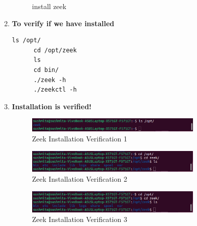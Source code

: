 \begin{enumerate}
\begin{figure}[H]
  \caption{install zeek}
\end{figure}
  \item \textbf{To verify if we have installed}
    \begin{lstlisting}[style=bashstyle]
      ls /opt/
      cd /opt/zeek
      ls
      cd bin/
      ./zeek -h
      ./zeekctl -h
    \end{lstlisting}
  \item \textbf{Installation is verified!}
  \begin{figure}[H]
  \centering
  \includegraphics[width=0.8\textwidth]{images/install/12_install_verification.png}
  \caption{Zeek Installation Verification 1}
  \end{figure}
  \begin{figure}[H]
  \centering
  \includegraphics[width=0.8\textwidth]{images/install/13_install_verification.png}
  \caption{Zeek Installation Verification 2}
  \end{figure}
  \begin{figure}[H]
  \centering
  \includegraphics[width=0.8\textwidth]{images/install/13_install_verification.png}
  \caption{Zeek Installation Verification 3}
  \end{figure}
\end{enumerate}
